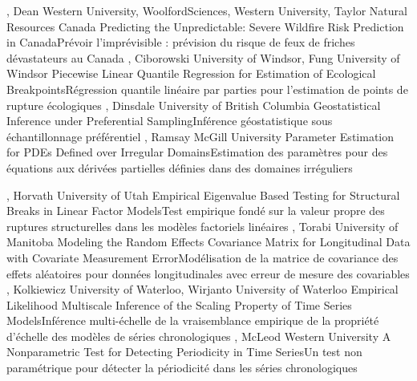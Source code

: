 {
,  {Dean}
{Western University},  {Woolford}{Sciences, Western University},  {Taylor}
{Natural Resources Canada}
}
{Predicting the Unpredictable: Severe Wildfire Risk Prediction in Canada}{Prévoir l’imprévisible : prévision du risque de feux de friches dévastateurs au Canada}
{\bubbleE \enspace \screenE}
{
,  {Ciborowski}
{University of Windsor},  {Fung}
{University of Windsor}
}
{Piecewise Linear Quantile Regression for Estimation of Ecological Breakpoints}{Régression quantile linéaire par parties pour l’estimation de points de rupture écologiques}
{\bubbleE \enspace \screenE}
{
,  {Dinsdale}
{University of British Columbia}
}
{Geostatistical Inference under Preferential Sampling}{Inférence géostatistique sous échantillonnage préférentiel}
{\bubbleE \enspace \screenE}
{
,  {Ramsay}
{McGill University}
}
{Parameter Estimation for PDEs Defined over Irregular Domains}{Estimation des paramètres pour des équations aux dérivées partielles définies dans des domaines irréguliers}
{\bubbleE \enspace \screenE}


{
,  {Horvath}
{University of Utah}
}
{Empirical Eigenvalue Based Testing for Structural Breaks in Linear Factor Models}{Test empirique fondé sur la valeur propre des ruptures structurelles dans les modèles factoriels linéaires}
{\bubbleE \enspace \screenE}
{
,  {Torabi}
{University of Manitoba}
}
{Modeling the Random Effects Covariance Matrix for Longitudinal Data with Covariate Measurement Error}{Modélisation de la matrice de covariance des effets aléatoires pour données longitudinales avec erreur de mesure des covariables}
{\bubbleE \enspace \screenE}
{
,  {Kolkiewicz}
{University of Waterloo},  {Wirjanto}
{University of Waterloo}
}
{Empirical Likelihood Multiscale Inference of the Scaling Property of Time Series Models}{Inférence multi-échelle de la vraisemblance empirique de la propriété d’échelle des modèles de séries chronologiques}
{\bubbleE \enspace \screenE}
{
,  {McLeod}
{Western University}
}
{A Nonparametric Test for Detecting Periodicity in Time Series}{Un test non paramétrique pour détecter la périodicité dans les séries chronologiques}
{\bubbleE \enspace \screenE}

